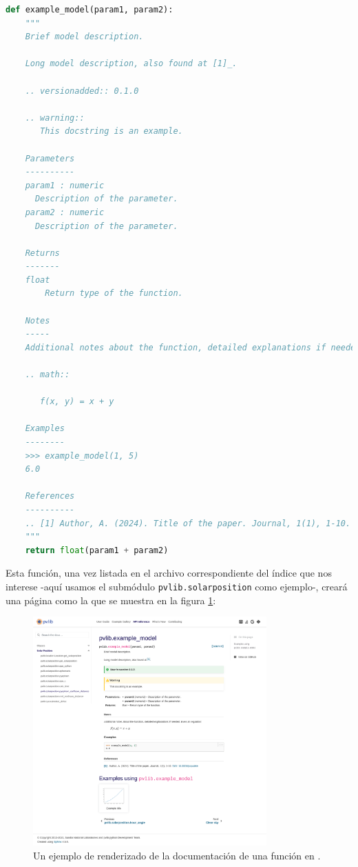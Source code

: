 \begin{lstlisting}[language=Python, caption={Ejemplo de documentación de una función en \pvlibpy.}, label={lst:doc_function_example}]
def example_model(param1, param2):
    """
    Brief model description.

    Long model description, also found at [1]_.

    .. versionadded:: 0.1.0

    .. warning::
       This docstring is an example.

    Parameters
    ----------
    param1 : numeric
      Description of the parameter.
    param2 : numeric
      Description of the parameter.

    Returns
    -------
    float
        Return type of the function.

    Notes
    -----
    Additional notes about the function, detailed explanations if needed. Even an equation:

    .. math::

       f(x, y) = x + y

    Examples
    --------
    >>> example_model(1, 5)
    6.0

    References
    ----------
    .. [1] Author, A. (2024). Title of the paper. Journal, 1(1), 1-10. :doi:`10.0001/populate`
    """
    return float(param1 + param2)
\end{lstlisting}

Esta \gls{función}, una vez listada en el archivo correspondiente del índice que nos interese -aquí usamos el \gls{submódulo} \texttt{pvlib.solarposition} como ejemplo-, creará una página como la que se muestra en la figura \ref{fig:doc_function_example}:

\begin{figure}[H]
    \centering
    \includegraphics[width=0.8\textwidth]{./images/how_to_document/function_stretch.png}
    \caption{Un ejemplo de renderizado de la documentación de una función en \pvlibpy.}
    \label{fig:doc_function_example}
\end{figure}

